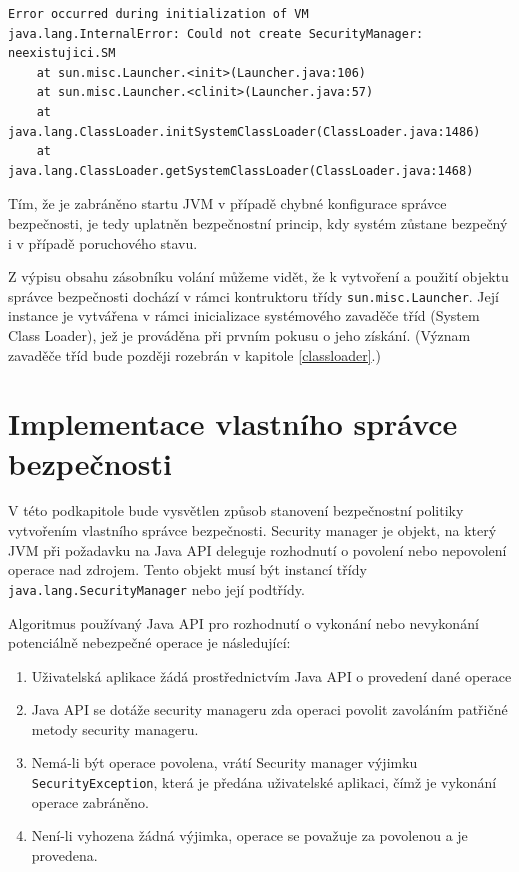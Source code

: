 \begin{lstlisting}[caption=Vyjímka při spuštění JVM s neexistujícím správcem bezpečnosti, label=smEx]
Error occurred during initialization of VM
java.lang.InternalError: Could not create SecurityManager: neexistujici.SM
    at sun.misc.Launcher.<init>(Launcher.java:106)
    at sun.misc.Launcher.<clinit>(Launcher.java:57)
    at java.lang.ClassLoader.initSystemClassLoader(ClassLoader.java:1486)
    at java.lang.ClassLoader.getSystemClassLoader(ClassLoader.java:1468)
\end{lstlisting}

Tím, že je zabráněno startu JVM v případě chybné konfigurace správce bezpečnosti, je tedy uplatněn bezpečnostní princip, kdy systém zůstane bezpečný i v případě poruchového stavu.

Z výpisu obsahu zásobníku volání můžeme vidět, že k vytvoření a použití objektu správce bezpečnosti dochází v rámci kontruktoru třídy {\tt sun.misc.Launcher}. Její instance je vytvářena v rámci inicializace systémového zavaděče tříd (System Class Loader), jež je prováděna při prvním pokusu o jeho získání. (Význam zavaděče tříd bude později rozebrán v kapitole \ref{classloader}.)

\section{Implementace vlastního správce bezpečnosti} \label{vlastniSM}

V této podkapitole bude vysvětlen způsob stanovení bezpečnostní politiky vytvořením vlastního správce bezpečnosti.
Security manager je objekt, na který JVM při požadavku na Java API deleguje rozhodnutí o povolení nebo nepovolení operace nad zdrojem.
Tento objekt musí být instancí třídy {\tt java.lang.SecurityManager} nebo její podtřídy. \cite{tutorialsTSM}

Algoritmus používaný Java API pro rozhodnutí o vykonání nebo nevykonání potenciálně nebezpečné operace je následující: \cite[4.1.1]{oaks}

\begin{enumerate}
  \item Uživatelská aplikace žádá prostřednictvím Java API o provedení dané operace
  \item Java API se dotáže security manageru zda operaci povolit zavoláním patřičné metody security manageru.
  \item Nemá-li být operace povolena, vrátí Security manager výjimku {\tt SecurityException}, která je předána uživatelské aplikaci, čímž je vykonání operace zabráněno.
  \item Není-li vyhozena žádná výjimka, operace se považuje za povolenou a je provedena.
\end{enumerate}

